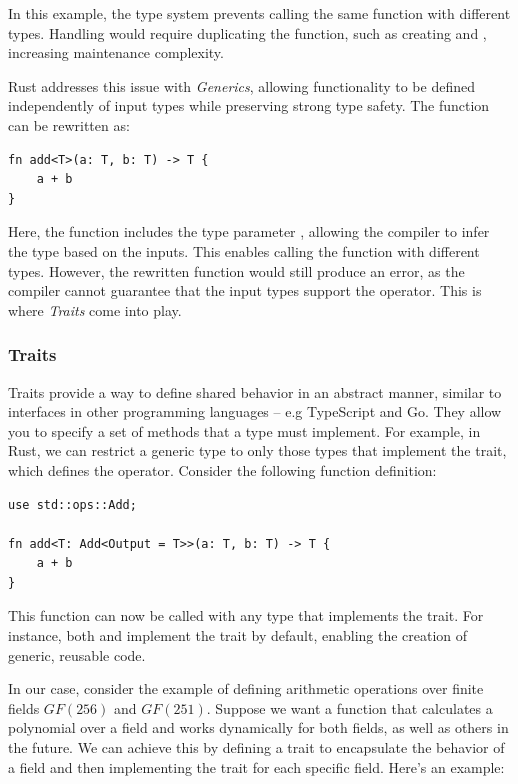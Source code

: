 \documentclass[11pt]{report}
\theoremstyle{definition}
\theoremstyle{plain}
\begin{document}
In this example, the type system prevents calling the same function with different types. Handling  would require duplicating the function, such as creating  and , increasing maintenance complexity.

Rust addresses this issue with \textit{Generics}, allowing functionality to be defined independently of input types while preserving strong type safety. The function  can be rewritten as:

\begin{verbatim}
fn add<T>(a: T, b: T) -> T {
    a + b
}
\end{verbatim}

Here, the function  includes the type parameter , allowing the compiler to infer the type based on the inputs. This enables calling the function with different types. However, the rewritten function would still produce an error, as the compiler cannot guarantee that the input types support the \rust{+} operator. This is where \textit{Traits} come into play.

\subsubsection{Traits}
Traits provide a way to define shared behavior in an abstract manner, similar to interfaces in other programming languages -- e.g TypeScript and Go. They allow you to specify a set of methods that a type must implement. For example, in Rust, we can restrict a generic type  to only those types that implement the  trait, which defines the \rust{+} operator. Consider the following function definition:

\begin{verbatim}
use std::ops::Add;

fn add<T: Add<Output = T>>(a: T, b: T) -> T {
    a + b
}
\end{verbatim}

This function can now be called with any type that implements the  trait. For instance, both  and  implement the  trait by default, enabling the creation of generic, reusable code.

In our case, consider the example of defining arithmetic operations over finite fields $GF(256)$ and $GF(251)$. Suppose we want a function that calculates a polynomial over a field and works dynamically for both fields, as well as others in the future. We can achieve this by defining a trait to encapsulate the behavior of a field and then implementing the trait for each specific field. Here's an example:
\end{document}
